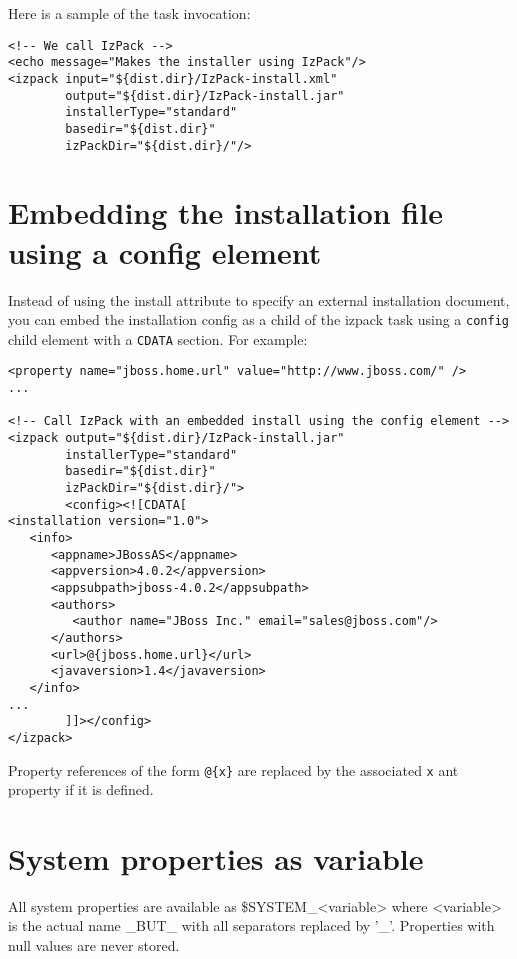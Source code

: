 Here is a sample of the task invocation:\\
\footnotesize
\begin{verbatim}
<!-- We call IzPack -->
<echo message="Makes the installer using IzPack"/>
<izpack input="${dist.dir}/IzPack-install.xml"
        output="${dist.dir}/IzPack-install.jar"
        installerType="standard"
        basedir="${dist.dir}"
        izPackDir="${dist.dir}/"/>
\end{verbatim}
\normalsize

\section{Embedding the installation file using a config element}
\label{embedconfig}

Instead of using the install attribute to specify an external installation
document, you can embed the installation config as a child of the izpack task
using a \texttt{config} child element with a \texttt{CDATA} section. For
example:

\footnotesize
\begin{verbatim}
<property name="jboss.home.url" value="http://www.jboss.com/" />
...

<!-- Call IzPack with an embedded install using the config element -->
<izpack output="${dist.dir}/IzPack-install.jar"
        installerType="standard"
        basedir="${dist.dir}"
        izPackDir="${dist.dir}/">
        <config><![CDATA[
<installation version="1.0">
   <info>
      <appname>JBossAS</appname>
      <appversion>4.0.2</appversion>
      <appsubpath>jboss-4.0.2</appsubpath>
      <authors>
         <author name="JBoss Inc." email="sales@jboss.com"/>
      </authors>
      <url>@{jboss.home.url}</url>
      <javaversion>1.4</javaversion>
   </info>
...
        ]]></config>
</izpack>
\end{verbatim}
\normalsize

Property references of the form \texttt{@\{x\}} are replaced by the associated
\texttt{x} ant property if it is defined.

\section{System properties as variable}

All system properties are available as
\$SYSTEM\_<variable> where <variable> is the actual name \_BUT\_ with
all separators replaced by '\_'. Properties with null values 
are never stored.\\

